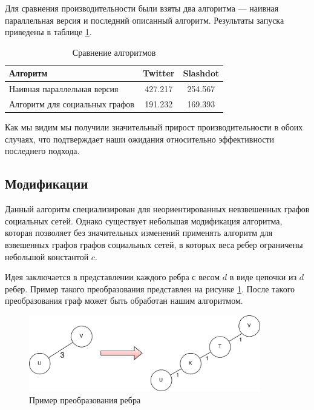 \FloatBarrier

Для сравнения производительности были взяты два алгоритма --- наивная параллельная версия и последний описанный алгоритм. Результаты запуска приведены в таблице \ref{table:algo_floyd_comparison}.   


\FloatBarrier
\begin{table}[H]
\centering
\caption{Сравнение алгоритмов}

\begin{tabular}{l|c|c} 
\hline 
Алгоритм & Twitter & Slashdot\\
\hline\hline
Наивная параллельная версия & 427.217 & 254.567 \\  
Алгоритм для социальных графов & 191.232 & 169.393  \\
\hline
\end{tabular}

\label {table:algo_floyd_comparison}
\end{table}
\FloatBarrier

Как мы видим мы получили значительный прирост производительности в обоих случаях, что подтверждает наши ожидания относительно эффективности последнего подхода.

\FloatBarrier
\subsection{Модификации}

Данный алгоритм специализирован для неориентированных невзвешенных графов социальных сетей. Однако существует небольшая модификация алгоритма, которая позволяет без значительных изменений применять алгоритм для взвешенных графов графов социальных сетей, в которых веса ребер ограничены небольшой константой $c$. 

Идея заключается в представлении каждого ребра с весом $d$ в виде цепочки из $d$ ребер. Пример такого преобразования представлен на рисунке \ref{edge_modification}. После такого преобразования граф может быть обработан нашим алгоритмом.

\FloatBarrier

\begin{figure}[h]
\caption{Пример преобразования ребра}
\label{edge_modification}
\centering
\includegraphics[width=0.9\textwidth]{img/floyd_social_modification.png}
\end{figure}
\FloatBarrier

